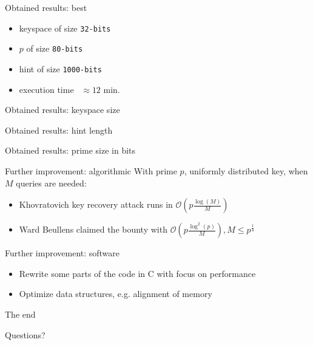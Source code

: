 \documentclass{beamer}
\theoremstyle{definition}
\theoremstyle{remark}
\renewcommand{\O}{\mathcal{O}}
\begin{document}
\begin{frame}{Obtained results: best}
\begin{itemize}
\item keyspace of size \texttt{32-bits}
\item $p$ of size \texttt{80-bits}
\item hint of size \texttt{1000-bits}
\item execution time \ $\approx12$ min.
\end{itemize} 
\end{frame}
\begin{frame}{Obtained results: keyspace size}

\end{frame}
\begin{frame}{Obtained results: hint length}

\end{frame}
\begin{frame}{Obtained results: prime size in bits}

\end{frame}
\begin{frame}{Further improvement: algorithmic}
With prime $p$, uniformly distributed key, when $M$ queries are needed:
\bigskip
\begin{itemize}
\item Khovratovich key recovery attack runs in $\O(p\frac{\log(M)}{M})$
\medskip
\item Ward Beullens claimed the bounty with $\O(p\frac{\log^2(p)}{M}), M\le p^\frac14$
\end{itemize}
\end{frame}
\begin{frame}{Further improvement: software}
\begin{itemize}
\item Rewrite some parts of the code in C with focus on performance
\medskip
\item Optimize data structures, e.g. alignment of memory
\end{itemize}
\end{frame}
\begin{frame}{The end}
\begin{center} \LARGE Questions? \end{center}
\end{frame}
\end{document}
